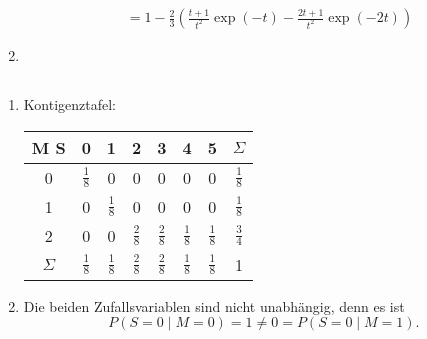 \documentclass[a4paper]{article}
\begin{document}
\begin{enumerate}
\begin{align*}
        &= 1 - \frac{2}{3} \left( \frac{t+1}{t^2} \exp(-t) - \frac{2t + 1}{t^2} \exp(-2t) \right)
    \end{align*}
    \item 
\end{enumerate}

\subsection{}
\begin{enumerate}
    \item Kontigenztafel:
    \begin{center}
        \begin{tabular}{|c|c|c|c|c|c|c|c|}
            \hline
            M  S & 0 & 1 & 2 & 3 & 4 & 5 & $\Sigma$ \\ \hline
            0 & $\frac{1}{8}$ & 0 & 0 & 0 & 0 & 0 & $\frac{1}{8}$ \\ \hline
            1 & 0 & $\frac{1}{8}$ & 0 & 0 & 0 & 0 & $\frac{1}{8}$ \\ \hline
            2 & 0 & 0 & $\frac{2}{8}$ & $\frac{2}{8}$ & $\frac{1}{8}$ & $\frac{1}{8}$ & $\frac{3}{4}$\\ \hline
            $\Sigma$ & $\frac{1}{8}$ & $\frac{1}{8}$ & $\frac{2}{8}$ & $\frac{2}{8}$ & $\frac{1}{8}$ & $\frac{1}{8}$ &  1 \\ \hline
        \end{tabular}
    \end{center}
    \item Die beiden Zufallsvariablen sind nicht unabhängig, denn es ist 
    \begin{equation*}
        P(S = 0 \mid M = 0) = 1 \neq 0 = P(S = 0 \mid M = 1) \text{.}
    \end{equation*}
\end{enumerate}
\end{document}

